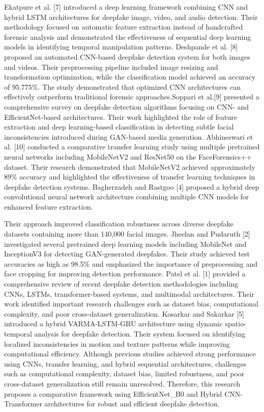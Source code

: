 \documentclass[12pt,a4paper]{report}
\begin{document}
Ekatpure et al. [7] introduced a deep learning framework combining CNN and hybrid LSTM architectures for deepfake image, video, and audio detection. Their methodology focused on automatic feature extraction instead of handcrafted forensic analysis and demonstrated the effectiveness of sequential deep learning models in identifying temporal manipulation patterns.
Deshpande et al. [8] proposed an automated CNN-based deepfake detection system for both images and videos. Their preprocessing pipeline included image resizing and transformation optimization, while the classification model achieved an accuracy of 95.775\%. The study demonstrated that optimized CNN architectures can effectively outperform traditional forensic approaches.Soppari et al.[9] presented a comprehensive survey on deepfake detection algorithms focusing on CNN- and EfficientNet-based architectures. Their work highlighted the role of feature extraction and deep learning-based classification in detecting subtle facial inconsistencies introduced during GAN-based media generation. Abhineswari et al. [10] conducted a comparative transfer learning study using multiple pretrained neural networks including MobileNetV2 and ResNet50 on the FaceForensics++ dataset. Their research demonstrated that MobileNetV2 achieved approximately 89\% accuracy and highlighted the effectiveness of transfer learning techniques in deepfake detection systems. Bagherzadeh and Rastgoo [4] proposed a hybrid deep convolutional neural network architecture combining multiple CNN models for enhanced feature extraction. 

Their approach improved classification robustness across diverse deepfake datasets containing more than 140,000 facial images. Jheelan and Pudaruth [2] investigated several pretrained deep learning models including MobileNet and InceptionV3 for detecting GAN-generated deepfakes. Their study achieved test accuracies as high as 98.5\% and emphasized the importance of preprocessing and face cropping for improving detection performance. Patel et al. [1] provided a comprehensive review of recent deepfake detection methodologies including CNNs, LSTMs, transformer-based systems, and multimodal architectures. Their work identified important research challenges such as dataset bias, computational complexity, and poor cross-dataset generalization. Kosarkar and Sakarkar [5] introduced a hybrid VARMA-LSTM-GRU architecture using dynamic spatio-temporal analysis for deepfake detection. Their system focused on identifying localized inconsistencies in motion and texture patterns while improving computational efficiency. Although previous studies achieved strong performance using CNNs, transfer learning, and hybrid sequential architectures, challenges such as computational complexity, dataset bias, limited robustness, and poor cross-dataset generalization still remain unresolved. Therefore, this research proposes a comparative framework using EfficientNet\_B0 and Hybrid CNN-Transformer architectures for robust and efficient deepfake detection.
\end{document}

